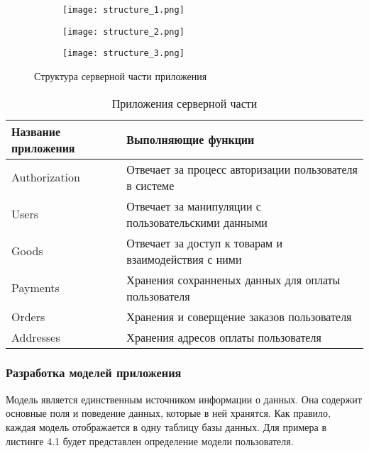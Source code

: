 \begin{figure}[htb!]
    \begin{subfigure}[b]{0.3\textwidth}
    \centering
    \texttt{[image: structure\_1.png]}
    \caption{}
    \end{subfigure}
    \begin{subfigure}[b]{0.3\textwidth}
    \centering
    \texttt{[image: structure\_2.png]}
    \caption{}
    \end{subfigure}
    \begin{subfigure}[b]{0.3\textwidth}
    \centering
    \texttt{[image: structure\_3.png]}
    \caption{}
    \end{subfigure}
    \caption{ Структура серверной части приложения }
    \label{back:struct}
\end{figure}

\begin{longtable}{ | l | p{6cm} | }
    \caption{Приложения серверной части}
    \label{back:apps}
    \endfirsthead
    \endhead
    \hline
    Название приложения & Выполняющие функции \\ \hline
    Authorization & Отвечает за процесс авторизации пользователя в системе \\ \hline
    Users & Отвечает за манипуляции с пользовательскими данными \\ \hline
    Goods & Отвечает за доступ к товарам и взаимодействия с ними \\ \hline
    Payments & Хранения сохранненых данных для оплаты пользователя\\ \hline
    Orders & Хранения и соверщение заказов пользователя \\ \hline
    Addresses & Хранения адресов оплаты пользователя \\ \hline
\end{longtable}

\subsubsection{Разработка моделей приложения}\hfill

Модель является единственным источником информации о данных.
Она содержит основные поля и поведение данных, которые в ней хранятся.
Как правило, каждая модель отображается в одну таблицу базы данных.
Для примера в листинге 4.1 будет представлен определение модели пользователя.

